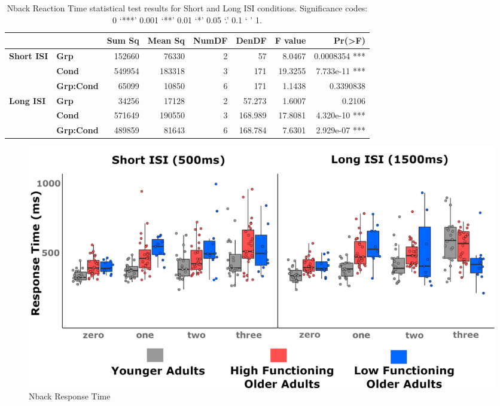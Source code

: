 \documentclass[a4paper,fleqn]{cas-sc}
\begin{document}
\begin{table}[h!]
\centering
\begin{tabular}{llrrrrrr}
\toprule
\multirow{2}{*}{}               & \multirow{2}{*}{}          & \textbf{Sum Sq}  & \textbf{Mean Sq} & \textbf{NumDF} & \textbf{DenDF} & \textbf{F value} & \textbf{Pr(>F)}          \\ 
\midrule
\multirow{3}{*}{\textbf{Short ISI}} 
                                & \textbf{Grp}              & 152660           & 76330            & 2              & 57             & 8.0467           & 0.0008354 ***             \\
                                & \textbf{Cond}             & 549954           & 183318           & 3              & 171            & 19.3255          & 7.733e-11 ***             \\
                                & \textbf{Grp:Cond}         & 65099            & 10850            & 6              & 171            & 1.1438           & 0.3390838               \\ 
\midrule
\multirow{3}{*}{\textbf{Long ISI}}
                                & \textbf{Grp}              & 34256            & 17128            & 2              & 57.273          & 1.6007           & 0.2106                   \\
                                & \textbf{Cond}             & 571649           & 190550           & 3              & 168.989         & 17.8081          & 4.320e-10 ***             \\
                                & \textbf{Grp:Cond}         & 489859           & 81643            & 6              & 168.784         & 7.6301           & 2.929e-07 ***             \\ 
\bottomrule
\end{tabular}
\caption{Nback Reaction Time statistical test results for Short and Long ISI conditions. Significance codes: 0 ‘***’ 0.001 ‘**’ 0.01 ‘*’ 0.05 ‘.’ 0.1 ‘ ’ 1.}
\label{tab:reaction_tiem}
\end{table}

\begin{figure}[ht]
    \centering
    \centering
    \includegraphics[clip, trim=0 0 0 0, width=\linewidth]{figs/nback_responseTime.png} %
    \caption{Nback Response Time}
    \label{fig:responeTime}
\end{figure}
\end{document}
